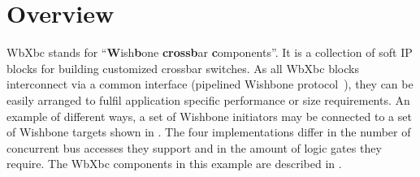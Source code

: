 
\section{Overview}
\label{overview}

WbXbc stands for ``\textbf{W}ish\textbf{b}one \textbf{cross}\textbf{b}ar \textbf{c}omponents''.
It is a collection of soft IP blocks for building customized crossbar switches.
As all WbXbc blocks interconnect via a common interface (pipelined Wishbone protocol~\cite{wishbone}),
they can be easily arranged to fulfil application specific performance or size requirements.
An example of different ways, a set of Wishbone initiators may be connected to a set of Wishbone targets
shown in . The four implementations differ in the number of concurrent bus accesses
they support and in the amount of logic gates they require. The WbXbc components in this example are
described in .
\vspace{4ex}

